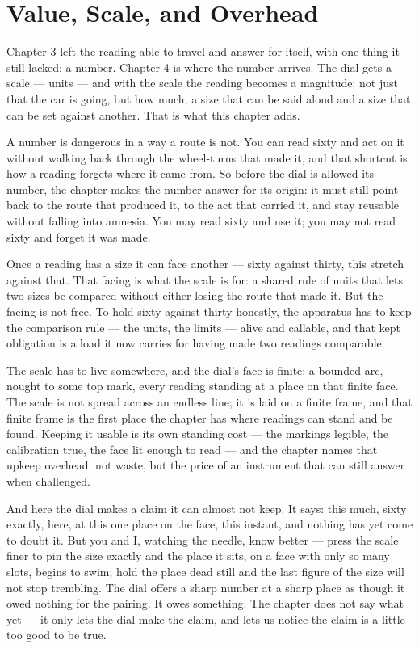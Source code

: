 \chapter{Value, Scale, and Overhead}

Chapter 3 left the reading able to travel and answer for itself, with one thing it still lacked: a number. Chapter 4 is where the number arrives. The dial gets a scale --- units --- and with the scale the reading becomes a magnitude: not just that the car is going, but how much, a size that can be said aloud and a size that can be set against another. That is what this chapter adds.

A number is dangerous in a way a route is not. You can read sixty and act on it without walking back through the wheel-turns that made it, and that shortcut is how a reading forgets where it came from. So before the dial is allowed its number, the chapter makes the number answer for its origin: it must still point back to the route that produced it, to the act that carried it, and stay reusable without falling into amnesia. You may read sixty and use it; you may not read sixty and forget it was made.

Once a reading has a size it can face another --- sixty against thirty, this stretch against that. That facing is what the scale is for: a shared rule of units that lets two sizes be compared without either losing the route that made it. But the facing is not free. To hold sixty against thirty honestly, the apparatus has to keep the comparison rule --- the units, the limits --- alive and callable, and that kept obligation is a load it now carries for having made two readings comparable.

The scale has to live somewhere, and the dial's face is finite: a bounded arc, nought to some top mark, every reading standing at a place on that finite face. The scale is not spread across an endless line; it is laid on a finite frame, and that finite frame is the first place the chapter has where readings can stand and be found. Keeping it usable is its own standing cost --- the markings legible, the calibration true, the face lit enough to read --- and the chapter names that upkeep overhead: not waste, but the price of an instrument that can still answer when challenged.

And here the dial makes a claim it can almost not keep. It says: this much, sixty exactly, here, at this one place on the face, this instant, and nothing has yet come to doubt it. But you and I, watching the needle, know better --- press the scale finer to pin the size exactly and the place it sits, on a face with only so many slots, begins to swim; hold the place dead still and the last figure of the size will not stop trembling. The dial offers a sharp number at a sharp place as though it owed nothing for the pairing. It owes something. The chapter does not say what yet --- it only lets the dial make the claim, and lets us notice the claim is a little too good to be true.

